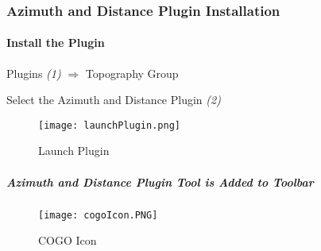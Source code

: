 \subsubsection{Azimuth and Distance Plugin Installation}

\paragraph*{Install the Plugin}

\noindent Plugins \emph{(1)} $\Rightarrow$ Topography Group
\vspace{.1in}

\noindent Select the Azimuth and Distance Plugin \emph{(2)}
\begin{figure}[H] %
\centering
    \texttt{[image: launchPlugin.png]}
\vspace{-.3in}

\caption{Launch Plugin}
\end{figure}
\vspace{.1in}

\subparagraph*{Azimuth and Distance Plugin Tool is Added to Toolbar}
\begin{figure}[H]
\centering
     \texttt{[image: cogoIcon.PNG]}

\caption{COGO Icon}
\end{figure}
\clearpage

